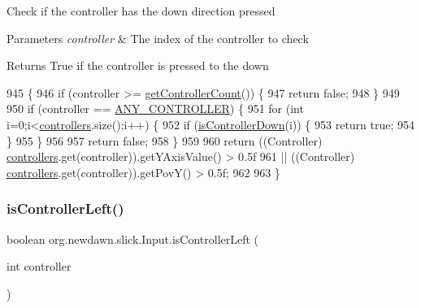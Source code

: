 Check if the controller has the down direction pressed


\begin{DoxyParams}{Parameters}
{\em controller} & The index of the controller to check \\
\hline
\end{DoxyParams}
\begin{DoxyReturn}{Returns}
True if the controller is pressed to the down 
\end{DoxyReturn}

\begin{DoxyCode}
945                                                     \{
946         \textcolor{keywordflow}{if} (controller >= \mbox{\hyperlink{classorg_1_1newdawn_1_1slick_1_1_input_a4a81c87f7d16d49471106d7fbaa0989d}{getControllerCount}}()) \{
947             \textcolor{keywordflow}{return} \textcolor{keyword}{false};
948         \}
949 
950         \textcolor{keywordflow}{if} (controller == \mbox{\hyperlink{classorg_1_1newdawn_1_1slick_1_1_input_a1f3df3cf41eaf8ae3bdf194d5cf96dd0}{ANY\_CONTROLLER}}) \{
951             \textcolor{keywordflow}{for} (\textcolor{keywordtype}{int} i=0;i<\mbox{\hyperlink{classorg_1_1newdawn_1_1slick_1_1_input_a1bcc91bf0db9efc578bd934a8ed9ce67}{controllers}}.size();i++) \{
952                 \textcolor{keywordflow}{if} (\mbox{\hyperlink{classorg_1_1newdawn_1_1slick_1_1_input_aa958c1b868e9398c8e2aeba952a67fd5}{isControllerDown}}(i)) \{
953                     \textcolor{keywordflow}{return} \textcolor{keyword}{true};
954                 \}
955             \}
956             
957             \textcolor{keywordflow}{return} \textcolor{keyword}{false};
958         \}
959         
960         \textcolor{keywordflow}{return} ((Controller) \mbox{\hyperlink{classorg_1_1newdawn_1_1slick_1_1_input_a1bcc91bf0db9efc578bd934a8ed9ce67}{controllers}}.get(controller)).getYAxisValue() > 0.5f
961                || ((Controller) \mbox{\hyperlink{classorg_1_1newdawn_1_1slick_1_1_input_a1bcc91bf0db9efc578bd934a8ed9ce67}{controllers}}.get(controller)).getPovY() > 0.5f;
962            
963     \}
\end{DoxyCode}
\mbox{\label{classorg_1_1newdawn_1_1slick_1_1_input_a872615473ab4b93e0baceccb68d62787}} 
\subsubsection{\texorpdfstring{is\+Controller\+Left()}{isControllerLeft()}}
{\footnotesize\ttfamily boolean org.\+newdawn.\+slick.\+Input.\+is\+Controller\+Left (\begin{DoxyParamCaption}\item[{int}]{controller }\end{DoxyParamCaption})\hspace{0.3cm}{\ttfamily [inline]}}

